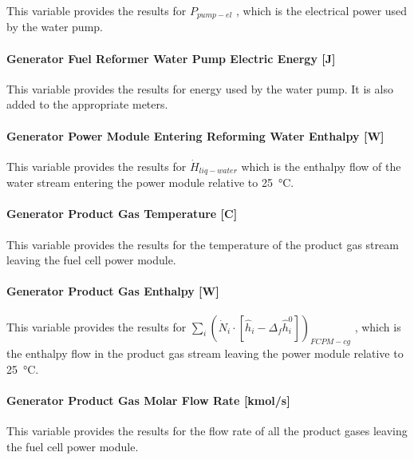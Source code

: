 This variable provides the results for \({P_{pump - el}}\) , which is the electrical power used by the water pump.

\paragraph{Generator Fuel Reformer Water Pump Electric Energy {[}J{]}}\label{generator-fuel-reformer-water-pump-electric-energy-j}

This variable provides the results for energy used by the water pump. It is also added to the appropriate meters.

\paragraph{Generator Power Module Entering Reforming Water Enthalpy {[}W{]}}\label{generator-power-module-entering-reforming-water-enthalpy-w}

This variable provides the results for \({\dot H_{liq - water}}\) which is the enthalpy flow of the water stream entering the power module relative to \SI{25}{\celsius}.

\paragraph{Generator Product Gas Temperature {[}C{]}}\label{generator-product-gas-temperature-c}

This variable provides the results for the temperature of the product gas stream leaving the fuel cell power module.

\paragraph{Generator Product Gas Enthalpy {[}W{]}}\label{generator-product-gas-enthalpy-w}

This variable provides the results for \({\sum\limits_i {\left( {{{\dot N}_i} \cdot \left[ {{{\hat h}_i} - {\Delta_f}\hat h_i^0} \right]} \right)}_{FCPM - cg}}\) , which is the enthalpy flow in the product gas stream leaving the power module relative to \SI{25}{\celsius}.

\paragraph{Generator Product Gas Molar Flow Rate {[}kmol/s{]}}\label{generator-product-gas-molar-flow-rate-kmols}

This variable provides the results for the flow rate of all the product gases leaving the fuel cell power module.

